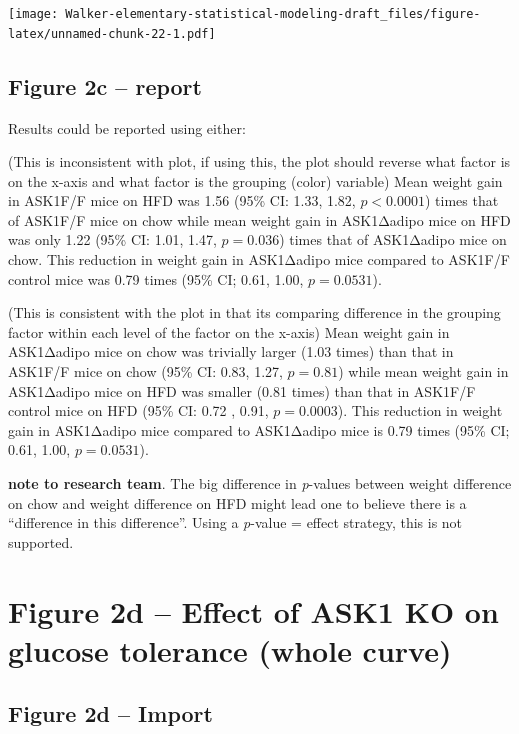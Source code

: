 \documentclass[]{book}
\begin{document}
\texttt{[image: Walker-elementary-statistical-modeling-draft\_files/figure-latex/unnamed-chunk-22-1.pdf]}

\hypertarget{figure-2c-report}{%
\subsection{Figure 2c -- report}\label{figure-2c-report}}

Results could be reported using either:

(This is inconsistent with plot, if using this, the plot should reverse what factor is on the x-axis and what factor is the grouping (color) variable) Mean weight gain in ASK1F/F mice on HFD was 1.56 (95\% CI: 1.33, 1.82, \(p < 0.0001\)) times that of ASK1F/F mice on chow while mean weight gain in ASK1Δadipo mice on HFD was only 1.22 (95\% CI: 1.01, 1.47, \(p = 0.036\)) times that of ASK1Δadipo mice on chow. This reduction in weight gain in ASK1Δadipo mice compared to ASK1F/F control mice was 0.79 times (95\% CI; 0.61, 1.00, \(p = 0.0531\)).

(This is consistent with the plot in that its comparing difference in the grouping factor within each level of the factor on the x-axis) Mean weight gain in ASK1Δadipo mice on chow was trivially larger (1.03 times) than that in ASK1F/F mice on chow (95\% CI: 0.83, 1.27, \(p = 0.81\)) while mean weight gain in ASK1Δadipo mice on HFD was smaller (0.81 times) than that in ASK1F/F control mice on HFD (95\% CI: 0.72 , 0.91, \(p = 0.0003\)). This reduction in weight gain in ASK1Δadipo mice compared to ASK1Δadipo mice is 0.79 times (95\% CI; 0.61, 1.00, \(p = 0.0531\)).

\textbf{note to research team}. The big difference in \emph{p}-values between weight difference on chow and weight difference on HFD might lead one to believe there is a ``difference in this difference''. Using a \emph{p}-value = effect strategy, this is not supported.

\hypertarget{figure-2d-effect-of-ask1-ko-on-glucose-tolerance-whole-curve}{%
\section{Figure 2d -- Effect of ASK1 KO on glucose tolerance (whole curve)}\label{figure-2d-effect-of-ask1-ko-on-glucose-tolerance-whole-curve}}

\hypertarget{figure-2d-import}{%
\subsection{Figure 2d -- Import}\label{figure-2d-import}}
\end{document}
